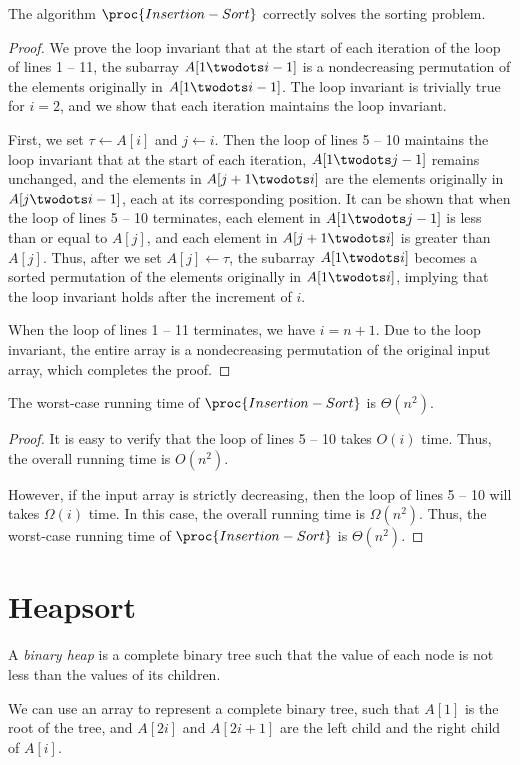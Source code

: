 \begin{theorem}
  The algorithm $\proc{Insertion-Sort}$ correctly solves the sorting problem.
\end{theorem}
\begin{proof}
  We prove the loop invariant that at the start of each iteration of the \For
  loop of lines 1 -- 11, the subarray $A[1 \twodots i-1]$ is a nondecreasing
  permutation of the elements originally in $A[1 \twodots i-1]$.
  The loop invariant is trivially true for $i = 2$, and we show that each
  iteration maintains the loop invariant.

  First, we set $\tau \gets A[i]$ and $j \gets i$.
  Then the \While loop of lines 5 -- 10 maintains the loop invariant that
  at the start of each iteration, $A[1 \twodots j-1]$ remains unchanged, and
  the elements in $A[j+1 \twodots i]$ are the elements originally in
  $A[j \twodots i-1]$, each at its corresponding position.
  It can be shown that when the \While loop of lines 5 -- 10 terminates,
  each element in $A[1 \twodots j-1]$ is less than or equal to $A[j]$, and each
  element in $A[j+1 \twodots i]$ is greater than $A[j]$.
  Thus, after we set $A[j] \gets \tau$, the subarray $A[1 \twodots i]$ becomes
  a sorted permutation of the elements originally in $A[1 \twodots i]$,
  implying that the loop invariant holds after the increment of $i$.

  When the \For loop of lines 1 -- 11 terminates, we have $i = n+1$.
  Due to the loop invariant, the entire array is a nondecreasing permutation of
  the original input array, which completes the proof.
\end{proof}

\begin{theorem}
  The worst-case running time of $\proc{Insertion-Sort}$ is $\Theta(n^2)$.
\end{theorem}
\begin{proof}
  It is easy to verify that the \While loop of lines 5 -- 10 takes $O(i)$ time.
  Thus, the overall running time is $O(n^2)$.

  However, if the input array is strictly decreasing, then the \While loop of
  lines 5 -- 10 will takes $\Omega(i)$ time.
  In this case, the overall running time is $\Omega(n^2)$.
  Thus, the worst-case running time of $\proc{Insertion-Sort}$ is
  $\Theta(n^2)$.
\end{proof}

\section{Heapsort}
\begin{definition}
  A \emph{binary heap} is a complete binary tree such that the value of each
  node is not less than the values of its children.

  We can use an array to represent a complete binary tree, such that $A[1]$
  is the root of the tree, and $A[2i]$ and $A[2i+1]$ are the left child and the
  right child of $A[i]$.
\end{definition}

